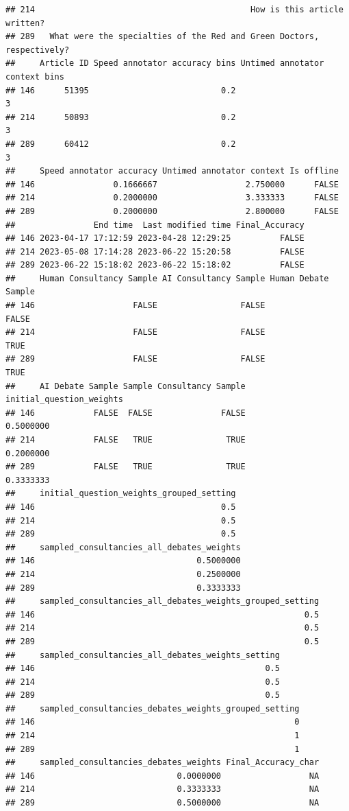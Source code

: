 \documentclass[
]{article}
\begin{document}
\begin{verbatim}
## 214                                            How is this article written?
## 289   What were the specialties of the Red and Green Doctors, respectively?
##     Article ID Speed annotator accuracy bins Untimed annotator context bins
## 146      51395                           0.2                              3
## 214      50893                           0.2                              3
## 289      60412                           0.2                              3
##     Speed annotator accuracy Untimed annotator context Is offline
## 146                0.1666667                  2.750000      FALSE
## 214                0.2000000                  3.333333      FALSE
## 289                0.2000000                  2.800000      FALSE
##                End time  Last modified time Final_Accuracy
## 146 2023-04-17 17:12:59 2023-04-28 12:29:25          FALSE
## 214 2023-05-08 17:14:28 2023-06-22 15:20:58          FALSE
## 289 2023-06-22 15:18:02 2023-06-22 15:18:02          FALSE
##     Human Consultancy Sample AI Consultancy Sample Human Debate Sample
## 146                    FALSE                 FALSE               FALSE
## 214                    FALSE                 FALSE                TRUE
## 289                    FALSE                 FALSE                TRUE
##     AI Debate Sample Sample Consultancy Sample initial_question_weights
## 146            FALSE  FALSE              FALSE                0.5000000
## 214            FALSE   TRUE               TRUE                0.2000000
## 289            FALSE   TRUE               TRUE                0.3333333
##     initial_question_weights_grouped_setting
## 146                                      0.5
## 214                                      0.5
## 289                                      0.5
##     sampled_consultancies_all_debates_weights
## 146                                 0.5000000
## 214                                 0.2500000
## 289                                 0.3333333
##     sampled_consultancies_all_debates_weights_grouped_setting
## 146                                                       0.5
## 214                                                       0.5
## 289                                                       0.5
##     sampled_consultancies_all_debates_weights_setting
## 146                                               0.5
## 214                                               0.5
## 289                                               0.5
##     sampled_consultancies_debates_weights_grouped_setting
## 146                                                     0
## 214                                                     1
## 289                                                     1
##     sampled_consultancies_debates_weights Final_Accuracy_char
## 146                             0.0000000                  NA
## 214                             0.3333333                  NA
## 289                             0.5000000                  NA
\end{verbatim}
\end{document}
